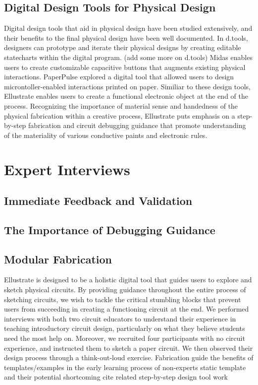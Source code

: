 \documentclass{sigchi}
\begin{document}
\subsection{Digital Design Tools for Physical Design}
Digital design tools that aid in physical design have been studied extensively, and their benefits to the final physical design have been well documented. In d.tools,  designers can prototype and iterate their physical designs by creating editable statecharts within the digital program. (add some more on d.tools) Midas enables users to create customizable capacitive buttons that augments existing physical interactions. PaperPulse explored a digital tool that allowed users to design microntoller-enabled interactions printed on paper. Similiar to these design tools, Ellustrate enables users to create a functional electronic object at the end of the process. Recognizing the importance of material sense and handedness of the physical fabrication within a creative process, Ellustrate puts emphasis on a step-by-step fabrication and circuit debugging guidance that promote understanding of the materiality of various conductive paints and electronic rules. 
 

\section{Expert Interviews}

\subsection{Immediate Feedback and Validation}
\subsection{The Importance of Debugging Guidance}
\subsection{Modular Fabrication}
Ellustrate is designed to be a holistic digital tool that guides users to explore and sketch physical circuits. By providing guidance throughout the entire process of sketching circuits, we wish to tackle the critical stumbling blocks that prevent users from succeeding in creating a functioning circuit at the end. We performed interviews with both two circuit educators to understand their experience in teaching introductory circuit design, particularly on what they believe students need the most help on.  Moreover, we recruited four participants with no circuit experience, and instructed them to sketch a paper circuit. We then observed their design process through a think-out-loud exercise. 
Fabrication guide 
the benefits of templates/examples in the early learning process of non-experts
static template and their potential shortcoming 
cite related step-by-step design tool work 
\end{document}
